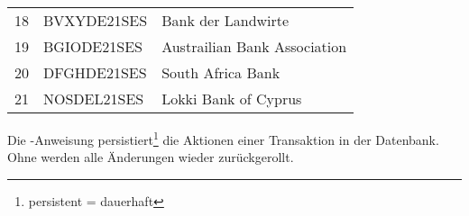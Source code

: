           \begin{center}
            \begin{small}
              \tablehead{}
              \tabletail {
              }
              \begin{msoraclesql}
                \begin{supertabular}{rll}
                  18 & BVXYDE21SES & Bank der Landwirte \\
                  19 & BGIODE21SES & Austrailian Bank Association \\
                  20 & DFGHDE21SES & South Africa Bank \\
                  21 & NOSDEL21SES & Lokki Bank of Cyprus  \\
                \end{supertabular}
              \end{msoraclesql}
            \end{small}
          \end{center}
          \begin{merke}
            Die \COMMIT-Anweisung persistiert\footnote{persistent = dauerhaft}
  					die Aktionen einer Transaktion in der Datenbank. Ohne \COMMIT{} werden alle
  					Änderungen wieder zurückgerollt.
          \end{merke}
